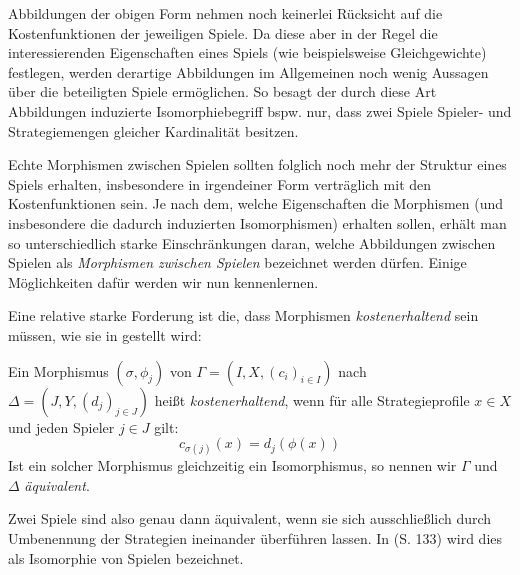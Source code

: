 Abbildungen der obigen Form nehmen noch keinerlei Rücksicht auf die Kostenfunktionen der jeweiligen Spiele. Da diese aber in der Regel die interessierenden Eigenschaften eines Spiels (wie beispielsweise Gleichgewichte) festlegen, werden derartige Abbildungen im Allgemeinen noch wenig Aussagen über die beteiligten Spiele ermöglichen. So besagt der durch diese Art Abbildungen induzierte Isomorphiebegriff bspw. nur, dass zwei Spiele Spieler- und Strategiemengen gleicher Kardinalität besitzen.

Echte Morphismen zwischen Spielen sollten folglich noch mehr der Struktur eines Spiels erhalten, insbesondere in irgendeiner Form \glqq verträglich\grqq{} mit den Kostenfunktionen sein. Je nach dem, welche Eigenschaften die Morphismen (und insbesondere die dadurch induzierten Isomorphismen) erhalten sollen, erhält man so unterschiedlich starke Einschränkungen daran, welche Abbildungen zwischen Spielen als \emph{Morphismen zwischen Spielen} bezeichnet werden dürfen. Einige Möglichkeiten dafür werden wir nun kennenlernen.

Eine relative starke Forderung ist die, dass Morphismen \emph{kostenerhaltend} sein müssen, wie sie in \cite{ReprOfFiniteGamesAsNCG} gestellt wird:

\begin{defn}
	Ein Morphismus $(\sigma, \phi_j)$ von $\Gamma = (I, X, (c_i)_{i\in I})$ nach $\Delta = (J, Y, (d_j)_{j\in J})$ heißt \emph{kostenerhaltend}, wenn für alle Strategieprofile $x \in X$ und jeden Spieler $j \in J$ gilt:
		\[c_{\sigma(j)}(x) = d_j(\phi(x)) \]
	Ist ein solcher Morphismus gleichzeitig ein Isomorphismus, so nennen wir $\Gamma$ und $\Delta$ \emph{äquivalent}.
\end{defn}

\begin{bem}
	Zwei Spiele sind also genau dann äquivalent, wenn sie sich ausschließlich durch Umbenennung der Strategien ineinander überführen lassen. In \cite{MonShap} (S. 133) wird dies als Isomorphie von Spielen bezeichnet.
\end{bem}

